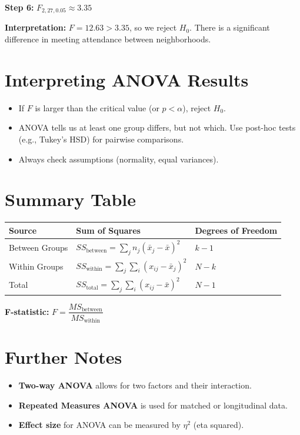 \documentclass[11pt]{article}
\begin{document}
\textbf{Step 6:} $F_{2,27,0.05} \approx 3.35$

\textbf{Interpretation:} $F = 12.63 > 3.35$, so we reject $H_0$. There is a significant difference in meeting attendance between neighborhoods.

\section{Interpreting ANOVA Results}

\begin{itemize}
    \item If $F$ is larger than the critical value (or $p < \alpha$), reject $H_0$.
    \item ANOVA tells us at least one group differs, but not which. Use post-hoc tests (e.g., Tukey's HSD) for pairwise comparisons.
    \item Always check assumptions (normality, equal variances).
\end{itemize}

\section{Summary Table}

\begin{tabular}{|l|l|l|}
\hline
\textbf{Source} & \textbf{Sum of Squares} & \textbf{Degrees of Freedom} \\
\hline
Between Groups & $SS_{\text{between}} = \sum_j n_j (\bar{x}_j - \bar{x})^2$ & $k-1$ \\
Within Groups & $SS_{\text{within}} = \sum_j \sum_i (x_{ij} - \bar{x}_j)^2$ & $N-k$ \\
Total & $SS_{\text{total}} = \sum_j \sum_i (x_{ij} - \bar{x})^2$ & $N-1$ \\
\hline
\end{tabular}

\vspace{1em}
\noindent
\textbf{F-statistic:} $F = \dfrac{MS_{\text{between}}}{MS_{\text{within}}}$

\section{Further Notes}

\begin{itemize}
    \item \textbf{Two-way ANOVA} allows for two factors and their interaction.
    \item \textbf{Repeated Measures ANOVA} is used for matched or longitudinal data.
    \item \textbf{Effect size} for ANOVA can be measured by $\eta^2$ (eta squared).
\end{itemize}
\end{document}
